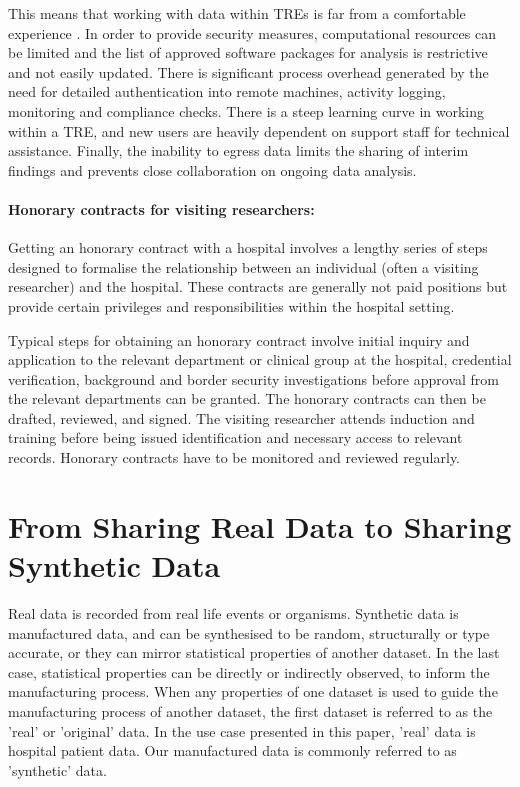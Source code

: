 \documentclass[11pt]{article}
\begin{document}
This means that working with data within TREs is far from a comfortable experience \cite{ODonovan2023}. In order to provide security measures, computational resources can be limited and the list of approved software packages for analysis is restrictive and not easily updated. There is significant process overhead generated by the need for detailed authentication into remote machines, activity logging, monitoring and compliance checks. There is a steep learning curve in working within a TRE, and new users are heavily dependent on support staff for technical assistance. Finally, the inability to egress data limits the sharing of interim findings and prevents close collaboration on ongoing data analysis.

\paragraph{Honorary contracts for visiting researchers:}


Getting an honorary contract with a hospital involves a lengthy series of steps designed to formalise the relationship between an individual (often a visiting researcher) and the hospital. These contracts are generally not paid positions but provide certain privileges and responsibilities within the hospital setting. 

Typical steps for obtaining an honorary contract involve initial inquiry and application to the relevant department or clinical group at the hospital, credential verification, background and border security investigations before approval from the relevant departments can be granted. The honorary contracts can then be drafted, reviewed, and signed. The visiting researcher attends induction and training before being issued identification and necessary access to relevant records. Honorary contracts have to be monitored and reviewed regularly. 

\section{From Sharing Real Data to Sharing Synthetic Data}
Real data is recorded from real life events or organisms. Synthetic data is manufactured data, and can be synthesised to be random, structurally or type accurate, or they can mirror statistical properties of another dataset. In the last case, statistical properties can be directly or indirectly observed, to inform the manufacturing process. When any properties of one dataset is used to guide the manufacturing process of another dataset, the first dataset is referred to as the 'real' or 'original' data. In the use case presented in this paper, 'real' data is hospital patient data. Our manufactured data is commonly referred to as 'synthetic' data.
\end{document}

